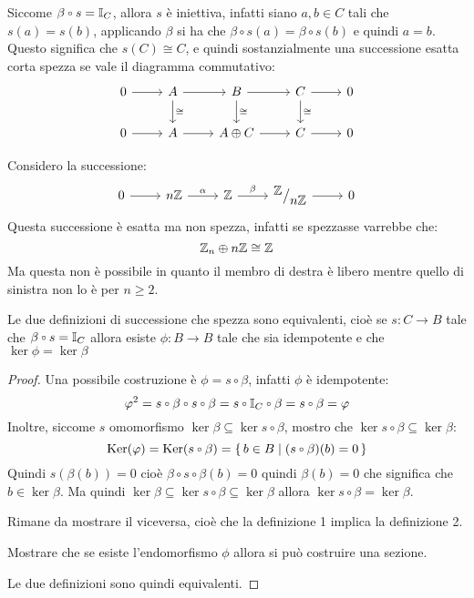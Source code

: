 \begin{osservation}
  Siccome $ \beta \circ s = \Id{C} $, allora $ s $ è iniettiva, infatti siano
  $ a, b \in C $ tali che $ s(a) = s(b) $, applicando $ \beta $ si ha che
  $ \beta \circ s (a) = \beta \circ s (b) $ e quindi $ a = b $. Questo significa che
  $ s(C) \cong C $, e quindi sostanzialmente una successione esatta corta spezza se
  vale il diagramma commutativo:
  \[
    \begin{tikzcd}
      0  \rar & A \rar \dar{\cong} & B \rar  \dar{\cong} & C \rar \dar{\cong} & 0 \\
      0 \rar & A \rar &  A \oplus C \rar & C \rar & 0
    \end{tikzcd}
  \]
\end{osservation}

\begin{example}
  Considero la successione:
  \[
    \begin{tikzcd}
      0 \arrow{r}{} & n \Z \arrow{r}{\alpha} & \Z \arrow{r}{\beta} & \quot{\Z}{n\Z} \arrow{r}{} & 0
    \end{tikzcd}
  \]
  Questa successione è esatta ma non spezza, infatti se spezzasse varrebbe che:
  \[
    \mathbb{Z}_n \oplus n \mathbb{Z} \cong \mathbb{Z}
  \]
  Ma questa non è possibile in quanto il membro di destra è libero mentre
  quello di sinistra non lo è per $ n \geq 2 $. %
\end{example}

\begin{proposition}
  Le due definizioni di successione che spezza sono equivalenti, cioè se
  $ s \colon C \to B $ tale che $ \beta \circ s = \Id{C} $ allora esiste
  $ \phi \colon B \to B $ tale che sia idempotente e che $ \ker{\phi} = \ker{\beta} $
\end{proposition}
\begin{proof}
  Una possibile costruzione è $ \phi = s \circ \beta  $, infatti $ \phi $ è idempotente:
  \[
    \phi^2 = s \circ \beta \circ s \circ \beta = s \circ \Id{C} \circ \beta = s \circ \beta = \phi
  \]
  Inoltre, siccome $ s $ omomorfismo $ \ker{\beta} \subseteq \ker{s \circ \beta } $,
  mostro che $ \ker{s \circ \beta} \subseteq \ker{\beta} $:
  \[
    \ker{\phi} = \ker{s \circ \beta} = \set{ b \in B | (s \circ \beta)(b) = 0}
  \]
  Quindi $ s(\beta(b)) = 0 $ cioè $  \beta \circ s \circ \beta (b) = 0 $ quindi $ \beta(b) = 0 $ che significa
  che $ b \in \ker{\beta} $. Ma quindi $ \ker{\beta} \subseteq \ker{s \circ \beta} \subseteq \ker{\beta} $ allora $ \ker{s \circ \beta} = \ker{\beta} $.

  Rimane da mostrare il viceversa, cioè che la definizione 1 implica la definizione 2.
  \begin{exercise}
    Mostrare che se esiste l'endomorfismo $ \phi $ allora si può costruire una sezione.
  \end{exercise}
  Le due definizioni sono quindi equivalenti.
\end{proof}

